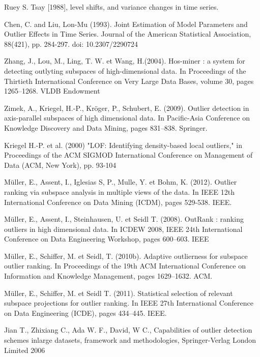 \begin{thebibliography}{99}
 Ruey S. Tsay [1988], level shifts, and variance changes in time series.

 Chen, C. and Liu, Lon-Mu (1993). Joint Estimation of Model Parameters and Outlier Effects in
Time Series. Journal of the American Statistical Association, 88(421), pp. 284-297. doi: 10.2307/2290724


Zhang, J., Lou, M., Ling, T. W. et Wang, H.(2004). Hos-miner : a system for detecting outlyting subspaces of high-dimensional data. In Proceedings of the Thirtieth International Conference on Very Large Data Bases, volume 30, pages 1265–1268. VLDB Endowment

Zimek, A., Kriegel, H.-P., Kröger, P., Schubert, E. (2009). Outlier detection in axis-parallel subspaces of high dimensional data. In Pacific-Asia Conference on Knowledge Discovery and Data Mining, pages 831–838. Springer.

Kriegel H.-P. et al. (2000) "LOF:  Identifying  density-based  local outliers," in Proceedings  of  the  ACM  SIGMOD  International  Conference  on  Management of Data (ACM, New York), pp. 93-104

Müller, E., Assent, I., Iglesias S, P., Mulle, Y. et Bohm, K. (2012). Outlier ranking via subspace analysis in multiple views of the data. In IEEE 12th International Conference on Data Mining (ICDM), pages 529-538. IEEE.

Müller, E., Assent, I., Steinhausen, U. et Seidl T. (2008). OutRank : ranking outliers in high dimensional
data. In ICDEW 2008, IEEE 24th International Conference on Data Engineering Workshop, pages 600–603. IEEE

Müller, E., Schiffer, M. et Seidl, T. (2010b). Adaptive outlierness for subspace outlier ranking. In Proceedings
of the 19th ACM International Conference on Information and Knowledge Management, pages 1629–1632. ACM.

Müller,  E., Schiffer, M. et Seidl T. (2011). Statistical selection of relevant subspace projections for outlier
ranking. In IEEE 27th International Conference on Data Engineering (ICDE), pages 434–445. IEEE.

Jian T., Zhixiang C.,
Ada W. F., David, W C., Capabilities of outlier detection schemes inlarge datasets, framework and methodologies, Springer-Verlag London Limited 2006



\end{thebibliography}
